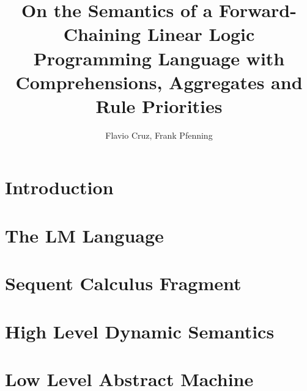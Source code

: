 \documentclass{llncs}
\begin{document}
\newcommand{\cmu}{\ensuremath{^\dag}}
\newcommand{\fcup}{\ensuremath{^\ddag}}

\title{On the Semantics of a Forward-Chaining Linear Logic Programming Language with
Comprehensions, Aggregates and Rule Priorities}
\author{Flavio Cruz, Frank Pfenning}



\maketitle
\begin{abstract}

\end{abstract}
\pagestyle{headings}  %

\section{Introduction}


\section{The LM Language}


\section{Sequent Calculus Fragment}


\section{High Level Dynamic Semantics}


\section{Low Level Abstract Machine}

\end{document}
